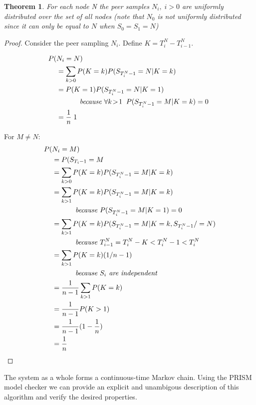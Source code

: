 \documentclass[a4paper,10pt]{article}
\newtheorem*{thm}{Theorem}
\newcommand{\mathins}[1]{\;\;\;\;\;\;\;\;\;\;\;\;\text{\em #1 \em}}
\begin{document}
\begin{thm}For each node N the peer samples $N_i, \; i>0$ are uniformly distributed over the set of all nodes (note that $N_0$ is not uniformly distributed since it can only be equal to $N$ when $S_0 = S_1 = N$)\end{thm}

\begin{proof}
Consider the peer sampling $N_i$. Define $K = T^N_i - T^N_{i-1}$.

\begin{align*}
P(&N_i = N) \\
& = \sum_{k>0} P(K=k) P(S_{T^N_i-1}=N | K=k) \\
& = P(K=1) P(S_{T^N_i-1}=N | K=1) \\
& \mathins{ because $\forall k\!>\!1 \;\; P(S_{T^N_i-1}=M | K=k) = 0$} \\
& = \frac{1}{n} \; 1 \\
\end{align*}

\noindent For $M \neq N$: \\
\begin{align*}
P(&N_i = M) \\
& = P(S_{T_i-1} = M \\
& = \sum_{k>0} P(K=k) P(S_{T^N_i-1}=M | K=k) \\
& = \sum_{k>1} P(K=k) P(S_{T^N_i-1}=M | K=k) \\
& \mathins{ because $P(S_{T^N_i-1}=M | K=1) = 0$} \\
& = \sum_{k>1} P(K=k) P(S_{T^N_i-1}=M | K=k, S_{T^N_i-1} /= N) \\
& \mathins{ because $T^N_{i-1} = T^N_i - K < T^N_i-1 < T^N_i$} \\
& = \sum_{k>1} P(K=k) (1 / n-1) \\
& \mathins{ because $S_i$ are independent} \\
& = \frac{1}{n-1} \sum_{k>1} P(K=k) \\
& = \frac{1}{n-1} P(K>1) \\
& = \frac{1}{n-1} (1 - \frac{1}{n}) \\
& = \frac{1}{n} \\
\end{align*}

\end{proof}

The system as a whole forms a continuous-time Markov chain. Using the PRISM model checker we can provide an explicit and unambigous description of this algorithm and verify the desired properties.
\end{document}
